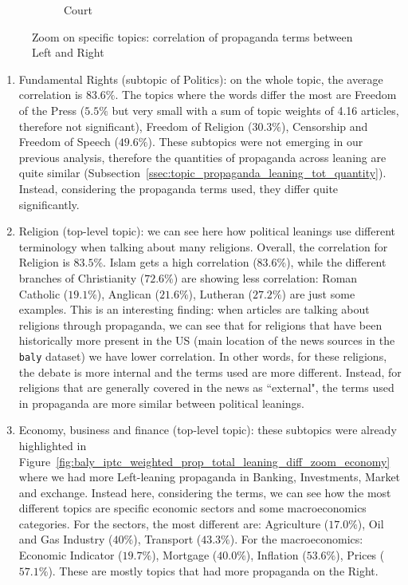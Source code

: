 \begin{figure}[!htbp]
\begin{subfigure}{0.45\textwidth}
		\caption{Court}
            \label{fig:baly_iptc_weighted_prop_leaning_corr_tfidf_zoom_court}
	\end{subfigure}
	
    \caption{Zoom on specific topics: correlation of propaganda terms between Left and Right}
    \label{fig:baly_iptc_weighted_prop_leaning_corr_tfidf_zoom}
\end{figure}

\begin{enumerate}
    \item Fundamental Rights (subtopic of Politics): on the whole topic, the average correlation is $83.6\%$. The topics where the words differ the most are Freedom of the Press ($5.5\%$ but very small with a sum of topic weights of 4.16 articles, therefore not significant), Freedom of Religion ($30.3\%$), Censorship and Freedom of Speech ($49.6\%$). These subtopics were not emerging in our previous analysis, therefore the quantities of propaganda across leaning are quite similar (Subsection~\ref{ssec:topic_propaganda_leaning_tot_quantity}). Instead, considering the propaganda terms used, they differ quite significantly.
    \item Religion (top-level topic): we can see here how political leanings use different terminology when talking about many religions. Overall, the correlation for Religion is $83.5\%$. Islam gets a high correlation ($83.6\%$), while the different branches of Christianity ($72.6\%$) are showing less correlation: Roman Catholic ($19.1\%$), Anglican ($21.6\%$), Lutheran ($27.2\%$) are just some examples. This is an interesting finding: when articles are talking about religions through propaganda, we can see that for religions that have been historically more present in the US (main location of the news sources in the \texttt{baly} dataset) we have lower correlation. In other words, for these religions, the debate is more internal and the terms used are more different. Instead, for religions that are generally covered in the news as ``external", the terms used in propaganda are more similar between political leanings.
    \item Economy, business and finance (top-level topic): these subtopics were already highlighted in Figure~\ref{fig:baly_iptc_weighted_prop_total_leaning_diff_zoom_economy} where we had more Left-leaning propaganda in Banking, Investments, Market and exchange. Instead here, considering the terms, we can see how the most different topics are specific economic sectors and some macroeconomics categories. For the sectors, the most different are: Agriculture ($17.0\%$), Oil and Gas Industry ($40\%$), Transport ($43.3\%$). For the macroeconomics: Economic Indicator ($19.7\%$), Mortgage ($40.0\%$), Inflation ($53.6\%$), Prices ($57.1\%$). These are mostly topics that had more propaganda on the Right.

\end{enumerate}
